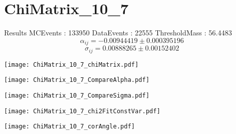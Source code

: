 \documentclass[a4paper,12pt]{article}
\begin{document}
\section{ChiMatrix\_10\_7}
\begin{minipage}{0.49\linewidth} Results \newline
MCEvents : 133950\newline
DataEvents : 22555 \newline
ThresholdMass : 56.4483\\
$$\alpha_{ij} = -0.00944419\pm 0.000395196$$
$$\sigma_{ij} = 0.00888265\pm 0.00152402$$
\end{minipage}\hfill
\begin{minipage}{0.49\linewidth} 
\texttt{[image: ChiMatrix\_10\_7\_chiMatrix.pdf]}\\
\end{minipage}
\hfill
\begin{minipage}{0.49\linewidth} 
\texttt{[image: ChiMatrix\_10\_7\_CompareAlpha.pdf]}\\
\end{minipage}
\hfill
\begin{minipage}{0.49\linewidth} 
\texttt{[image: ChiMatrix\_10\_7\_CompareSigma.pdf]}\\
\end{minipage}
\begin{minipage}{0.49\linewidth} 
\texttt{[image: ChiMatrix\_10\_7\_chi2FitConstVar.pdf]}\\
\end{minipage}
\hfill
\begin{minipage}{0.49\linewidth} 
\texttt{[image: ChiMatrix\_10\_7\_corAngle.pdf]}\\
\end{minipage}
\end{document}
